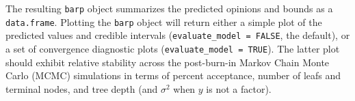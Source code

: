 \documentclass[]{article}
\newenvironment{Shaded}{\begin{snugshade}}{\end{snugshade}}
\newcommand{\KeywordTok}[1]{\textcolor[rgb]{0.13,0.29,0.53}{\textbf{#1}}}
\newcommand{\DataTypeTok}[1]{\textcolor[rgb]{0.13,0.29,0.53}{#1}}
\newcommand{\DecValTok}[1]{\textcolor[rgb]{0.00,0.00,0.81}{#1}}
\newcommand{\StringTok}[1]{\textcolor[rgb]{0.31,0.60,0.02}{#1}}
\newcommand{\OtherTok}[1]{\textcolor[rgb]{0.56,0.35,0.01}{#1}}
\newcommand{\OperatorTok}[1]{\textcolor[rgb]{0.81,0.36,0.00}{\textbf{#1}}}
\newcommand{\NormalTok}[1]{#1}
\begin{document}
\begin{Shaded}
\end{Shaded}

The resulting \texttt{barp} object summarizes the predicted opinions and
bounds as a \texttt{data.frame}. Plotting the \texttt{barp} object will
return either a simple plot of the predicted values and credible
intervals (\texttt{evaluate\_model\ =\ FALSE}, the default), or a set of
convergence diagnostic plots (\texttt{evaluate\_model\ =\ TRUE}). The
latter plot should exhibit relative stability across the post-burn-in
Markov Chain Monte Carlo (MCMC) simulations in terms of percent
acceptance, number of leafs and terminal nodes, and tree depth (and
\(\sigma^2\) when \(y\) is not a factor).

\begin{Shaded}
\end{Shaded}
\end{document}
